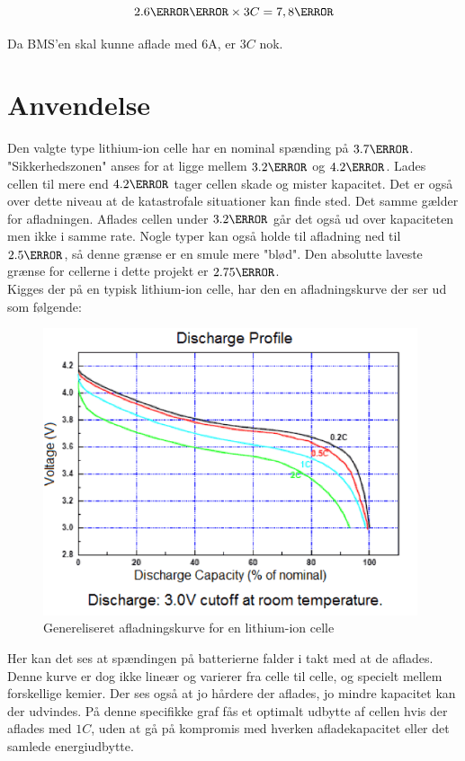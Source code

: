 \begin {equation}
2.6\ampere\hour \times 3C = 7,8\ampere
\end {equation}

Da BMS'en skal kunne aflade med 6A, er $3C$ nok.

\section{Anvendelse}
Den valgte type lithium-ion celle har en nominal spænding på $3.7\volt$. "Sikkerhedszonen" \space anses for at ligge mellem $3.2\volt$ og $4.2\volt$. Lades cellen til mere end $4.2\volt$ tager cellen skade og mister kapacitet. Det er også over dette niveau at de katastrofale situationer kan finde sted. Det samme gælder for afladningen. Aflades cellen under $3.2\volt$ går det også ud over kapaciteten men ikke i samme rate. Nogle typer kan også holde til afladning ned til $2.5\volt$, så denne grænse er en smule mere "blød". Den absolutte laveste grænse for cellerne i dette projekt er $2.75\volt$. \\

Kigges der på en typisk lithium-ion celle, har den en afladningskurve der ser ud som følgende: 

\begin{figure}[h]
\centering
\includegraphics[width=11cm]{billeder/discharge_curve.png}
\caption{Genereliseret afladningskurve for en lithium-ion celle}
\label{fig:discharge_curve}
\end{figure}

Her kan det ses at spændingen på batterierne falder i takt med at de aflades. Denne kurve er dog ikke lineær og varierer fra celle til celle, og specielt mellem forskellige kemier. Der ses også at jo hårdere der aflades, jo mindre kapacitet kan der udvindes. På denne specifikke graf fås et optimalt udbytte af cellen hvis der aflades med $1C$, uden at gå på kompromis med hverken afladekapacitet eller det samlede energiudbytte. \\

